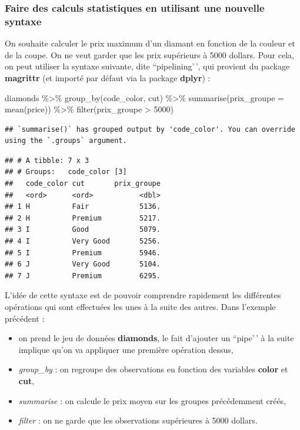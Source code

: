 \documentclass[
]{book}
\newenvironment{Shaded}{\begin{snugshade}}{\end{snugshade}}
\newcommand{\AttributeTok}[1]{\textcolor[rgb]{0.77,0.63,0.00}{#1}}
\newcommand{\DecValTok}[1]{\textcolor[rgb]{0.00,0.00,0.81}{#1}}
\newcommand{\FunctionTok}[1]{\textcolor[rgb]{0.00,0.00,0.00}{#1}}
\newcommand{\NormalTok}[1]{#1}
\newcommand{\SpecialCharTok}[1]{\textcolor[rgb]{0.00,0.00,0.00}{#1}}
\providecommand{\tightlist}{%
  \setlength{\itemsep}{0pt}\setlength{\parskip}{0pt}}
\theoremstyle{definition}
\theoremstyle{definition}
\theoremstyle{definition}
\theoremstyle{definition}
\theoremstyle{remark}
\begin{document}
\hypertarget{faire-des-calculs-statistiques-en-utilisant-une-nouvelle-syntaxe}{%
\subsubsection{Faire des calculs statistiques en utilisant une nouvelle syntaxe}\label{faire-des-calculs-statistiques-en-utilisant-une-nouvelle-syntaxe}}

On souhaite calculer le prix maximum d'un diamant en fonction de la couleur et de la coupe. On ne veut garder que les prix supérieurs à 5000 dollars. Pour cela, on peut utiliser la syntaxe suivante, dite ``pipelining'\,', qui provient du package \textbf{magrittr} (et importé par défaut via la package \textbf{dplyr}) :

\begin{Shaded}
\begin{Highlighting}[]
\NormalTok{diamonds }\SpecialCharTok{\%\textgreater{}\%} 
  \FunctionTok{group\_by}\NormalTok{(code\_color, cut) }\SpecialCharTok{\%\textgreater{}\%} 
  \FunctionTok{summarise}\NormalTok{(}\AttributeTok{prix\_groupe =} \FunctionTok{mean}\NormalTok{(price)) }\SpecialCharTok{\%\textgreater{}\%} 
  \FunctionTok{filter}\NormalTok{(prix\_groupe }\SpecialCharTok{\textgreater{}} \DecValTok{5000}\NormalTok{)}
\end{Highlighting}
\end{Shaded}

\begin{verbatim}
## `summarise()` has grouped output by 'code_color'. You can override using the `.groups` argument.
\end{verbatim}

\begin{verbatim}
## # A tibble: 7 x 3
## # Groups:   code_color [3]
##   code_color cut       prix_groupe
##   <ord>      <ord>           <dbl>
## 1 H          Fair            5136.
## 2 H          Premium         5217.
## 3 I          Good            5079.
## 4 I          Very Good       5256.
## 5 I          Premium         5946.
## 6 J          Very Good       5104.
## 7 J          Premium         6295.
\end{verbatim}

L'idée de cette syntaxe est de pouvoir comprendre rapidement les différentes opérations qui sont effectuées les unes à la suite des autres. Dans l'exemple précédent :

\begin{itemize}
\tightlist
\item
  on prend le jeu de données \textbf{diamonds}, le fait d'ajouter un ``pipe'\,' à la suite implique qu'on va appliquer une première opération dessus,
\item
  \emph{group\_by} : on regroupe des observations en fonction des variables \textbf{color} et \textbf{cut},
\item
  \emph{summarise} : on calcule le prix moyen sur les groupes précédemment créés,
\item
  \emph{filter} : on ne garde que les observations supérieures à 5000 dollars.
\end{itemize}
\end{document}
